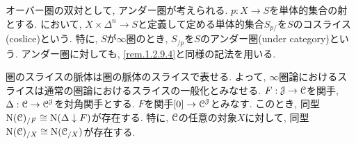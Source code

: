 \documentclass[uplatex, a4paper, 14Q, dvipdfmx]{jsreport}
\begin{document}
\begin{remark} \label{rem.1.2.9.5}
  オーバー圏の双対として, アンダー圏が考えられる. 
  $p : X \to S$を単体的集合の射とする. 
  において, $X \times \Delta^n \to S$と定義して定める単体的集合$S_{p/}$を$S$のコスライス(coslice)という. 
  特に, $S$が$\infty$圏のとき, $S_{/p}$を$S$のアンダー圏(under category)という. 
  アンダー圏に対しても, \cref{rem.1.2.9.4}と同様の記法を用いる. 
\end{remark}

\begin{remark} \label{rem.1.2.9.6}
  圏のスライスの脈体は圏の脈体のスライスで表せる. 
よって, $\infty$圏論におけるスライスは通常の圏論におけるスライスの一般化とみなせる. 
  $F : \mathcal{J} \to \mathcal{C}$を関手, $\Delta : \mathcal{C} \to \mathcal{C}^{\mathcal{J}}$を対角関手とする. 
  $F$を関手$[0] \to \mathcal{C}^{\mathcal{J}}$とみなす. 
  このとき, 同型$\mathrm{N}(\mathcal{C})_{/F} \cong \mathrm{N}(\Delta \downarrow F)$が存在する. 
  特に, $\mathcal{C}$の任意の対象$X$に対して, 同型$\mathrm{N}(\mathcal{C})_{/X} \cong \mathrm{N}(\mathcal{C}_{/X})$が存在する. 
\end{remark}
\end{document}
